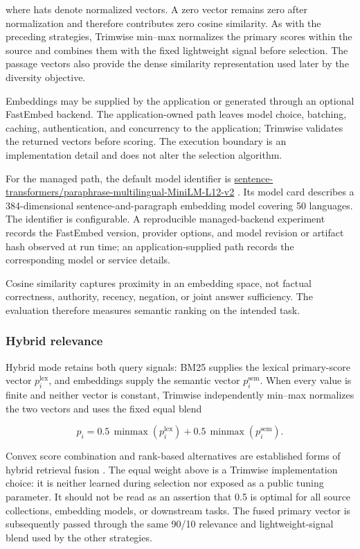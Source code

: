 \documentclass[
]{article}
\begin{document}
where hats denote normalized vectors. A zero vector remains zero after
normalization and therefore contributes zero cosine similarity. As with
the preceding strategies, Trimwise min--max normalizes the primary
scores within the source and combines them with the fixed lightweight
signal before selection. The passage vectors also provide the dense
similarity representation used later by the diversity objective.

Embeddings may be supplied by the application or generated through an
optional FastEmbed backend. The application-owned path leaves model
choice, batching, caching, authentication, and concurrency to the
application; Trimwise validates the returned vectors before scoring. The
execution boundary is an implementation detail and does not alter the
selection algorithm.

For the managed path, the default model identifier is
\url{sentence-transformers/paraphrase-multilingual-MiniLM-L12-v2}
\citep{sentence-transformers-paraphrase-multilingual-minilm-l12-v2}. Its
model card describes a 384-dimensional sentence-and-paragraph embedding
model covering 50 languages. The identifier is configurable. A
reproducible managed-backend experiment records the FastEmbed version,
provider options, and model revision or artifact hash observed at run
time; an application-supplied path records the corresponding model or
service details.

Cosine similarity captures proximity in an embedding space, not factual
correctness, authority, recency, negation, or joint answer sufficiency.
The evaluation therefore measures semantic ranking on the intended task.

\subsubsection{Hybrid relevance}\label{hybrid-relevance}

Hybrid mode retains both query signals: BM25 supplies the lexical
primary-score vector \(p_i^{\mathrm{lex}}\), and embeddings supply the
semantic vector \(p_i^{\mathrm{sem}}\). When every value is finite and
neither vector is constant, Trimwise independently min--max normalizes
the two vectors and uses the fixed equal blend

\[
p_i = 0.5\,\operatorname{minmax}(p_i^{\mathrm{lex}})
    + 0.5\,\operatorname{minmax}(p_i^{\mathrm{sem}}).
\]

Convex score combination and rank-based alternatives are established
forms of hybrid retrieval fusion
\citep{bruch-gai-ingber-2023-hybrid-fusion}. The equal weight above is a
Trimwise implementation choice: it is neither learned during selection
nor exposed as a public tuning parameter. It should not be read as an
assertion that 0.5 is optimal for all source collections, embedding
models, or downstream tasks. The fused primary vector is subsequently
passed through the same 90/10 relevance and lightweight-signal blend
used by the other strategies.
\end{document}
